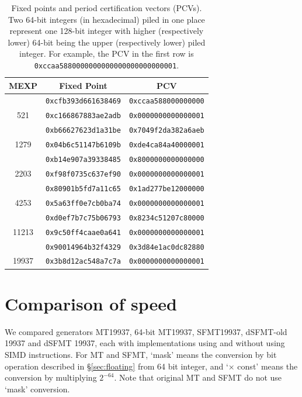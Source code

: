 \documentclass{svmult}
\begin{document}
\begin{table}
  \begin{center}
    \caption{Fixed points and period certification vectors (PCVs). 
      Two 64-bit integers (in hexadecimal) piled in one place represent one 128-bit 
      integer with higher (respectively lower) 64-bit being the upper 
      (respectively lower) piled integer. For example, the PCV in the first
      row is \texttt{0xccaa5880000000000000000000000001}.
    }
    \label{tab:pcv}
    \begin{tabular}{c||c|c} \hline
      MEXP & Fixed Point %
      & PCV \\ \hline \hline %
      & \texttt{0xcfb393d661638469} & \texttt{0xccaa588000000000} \\
      521 & \texttt{0xc166867883ae2adb} &\texttt{0x0000000000000001} \\ \hline
      & \texttt{0xb66627623d1a31be} & \texttt{0x7049f2da382a6aeb} \\
      1279 & \texttt{0x04b6c51147b6109b} & \texttt{0xde4ca84a40000001} \\ \hline
      & \texttt{0xb14e907a39338485} & \texttt{0x8000000000000000} \\
      2203 & \texttt{0xf98f0735c637ef90} & \texttt{0x0000000000000001} \\ \hline
      & \texttt{0x80901b5fd7a11c65} & \texttt{0x1ad277be12000000} \\
      4253 & \texttt{0x5a63ff0e7cb0ba74} & \texttt{0x0000000000000001} \\ \hline
      & \texttt{0xd0ef7b7c75b06793} & \texttt{0x8234c51207c80000} \\
      11213 & \texttt{0x9c50ff4caae0a641} & \texttt{0x0000000000000001}\\ \hline
      & \texttt{0x90014964b32f4329} & \texttt{0x3d84e1ac0dc82880} \\
      19937 & \texttt{0x3b8d12ac548a7c7a} & \texttt{0x0000000000000001} \\ 
      \hline
    \end{tabular}
  \end{center}
\end{table}

\section{Comparison of speed}\label{sec:comp-speed}
We compared generators MT19937, 64-bit MT19937, SFMT19937, dSFMT-old
19937 and dSFMT 19937, each with implementations using and
without using SIMD instructions. For MT and SFMT, `mask' means the
conversion by bit operation described in \S\ref{sec:floating} from 64
bit integer, %
and `$\times$ const' means the
conversion by multiplying $2^{-64}$. Note that original MT and SFMT
do not use `mask' conversion.
\end{document}
